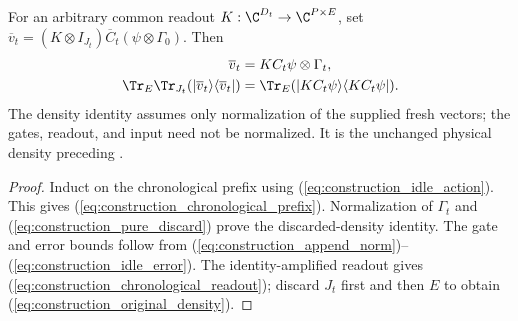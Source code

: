 \begin{theorem}
    For an arbitrary common readout $K:\C^{D_t}\to\C^{P\times E}$,
    set $\overline v_t=(K\otimes I_{J_t})
        \overline C_t(\psi\otimes\Gamma_0)$. Then
    \begin{align}
        \overline v_t & =KC_t\psi\otimes\Gamma_t,
        \label{eq:construction_chronological_readout}              \\
        \Tr_E\Tr_{J_t}(|\overline v_t\rangle\langle\overline v_t|)
                      & =\Tr_E(|KC_t\psi\rangle\langle KC_t\psi|).
        \label{eq:construction_original_density}
    \end{align}
    The density identity assumes only normalization of the supplied
    fresh vectors; the gates, readout, and input need not be normalized.
    It is the unchanged physical density preceding
    \cite[Equation~(5.3)]{OpenAI2026PolynomialPEPS}.
\end{theorem}

\begin{proof}\leanok
    Induct on the chronological prefix using
    (\ref{eq:construction_idle_action}). This gives
    (\ref{eq:construction_chronological_prefix}).
    Normalization of $\Gamma_t$ and
    (\ref{eq:construction_pure_discard}) prove the discarded-density
    identity. The gate and error bounds follow from
    (\ref{eq:construction_append_norm})--(\ref{eq:construction_idle_error}).
    The identity-amplified readout gives
    (\ref{eq:construction_chronological_readout}); discard $J_t$ first
    and then $E$ to obtain (\ref{eq:construction_original_density}).
\end{proof}

